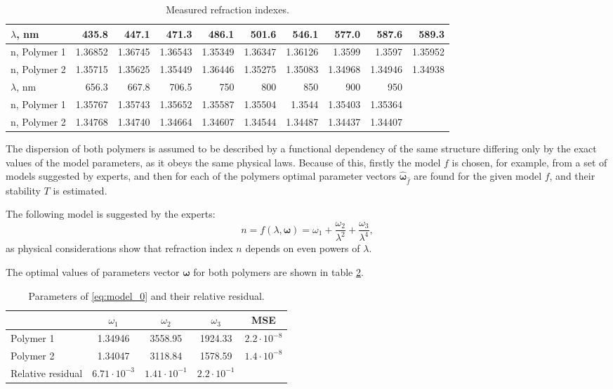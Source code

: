 \documentclass[11pt,a4paper]{article}
\theoremstyle{definition}
\begin{document}
\begin{table}[h]
  \footnotesize
  \caption{Measured refraction indexes.}
  \centering
  \begin{tabular}{l | r | r | r | r | r | r | r | r | r}
	$\lambda$, nm	& 435.8		& 447.1		& 471.3		& 486.1		& 501.6		& 546.1		& 577.0		& 587.6		& 589.3		\\ \hline
	n, Polymer 1	& 1.36852	& 1.36745	& 1.36543	& 1.35349	& 1.36347	& 1.36126	& 1.3599	& 1.3597	& 1.35952	\\ \hline
	n, Polymer 2	& 1.35715	& 1.35625	& 1.35449	& 1.36446	& 1.35275	& 1.35083	& 1.34968	& 1.34946	& 1.34938	\\ \hline

	$\lambda$, nm	& 656.3		& 667.8		& 706.5		& 750		& 800		& 850		& 900		& 950		\\ \hline
	n, Polymer 1	& 1.35767	& 1.35743	& 1.35652	& 1.35587	& 1.35504	& 1.3544	& 1.35403	& 1.35364	\\ \hline
	n, Polymer 2	& 1.34768	& 1.34740	& 1.34664	& 1.34607	& 1.34544	& 1.34487	& 1.34437	& 1.34407	\\ \hline
  \end{tabular}
  \label{tabl:source_data}
\end{table}

The dispersion of both polymers is assumed to be described by a functional dependency
of the same structure differing only by the exact values of the model parameters,
as it obeys the same physical laws. Because of this, firstly the model $f$
is chosen, for example, from a set of models suggested by experts, and then
for each of the polymers optimal parameter vectors $\hat{\boldsymbol{\omega}}_{\hat{f}}$
are found for the given model $f$, and their stability $T$ is estimated.

The following model is suggested by the experts:
\begin{equation}
  n = f(\lambda, \boldsymbol{\omega}) = \omega_1 + \frac{\omega_2}{\lambda^2} + \frac{\omega_3}{\lambda^4},
  \label{eq:model_0}
\end{equation}
as physical considerations show that refraction index $n$ depends on even powers
of $\lambda$.

The optimal values of parameters vector $\boldsymbol{\omega}$ for both polymers are
shown in table \ref{tabl:res_even_coeffs}.

\begin{table}[h]
  \centering
  \footnotesize
  \caption{Parameters of \eqref{eq:model_0} and their relative residual.}
  \begin{tabular}{l | c | c | c | c}
						& $\omega_1$			& $\omega_2$				& $\omega_3$				& MSE	\\ \hline
    Polymer 1			& 1.34946				& 3558.95				& 1924.33				& $2.2 \cdot 10^{-8}$		\\
    Polymer 2			& 1.34047				& 3118.84				& 1578.59				& $1.4 \cdot 10^{-8}$		\\
    Relative residual	& $6.71 \cdot 10^{-3}$	& $1.41 \cdot 10^{-1}$	& $2.2 \cdot 10^{-1}$	&	\\
  \end{tabular}
  \label{tabl:res_even_coeffs}
\end{table}
\end{document}
